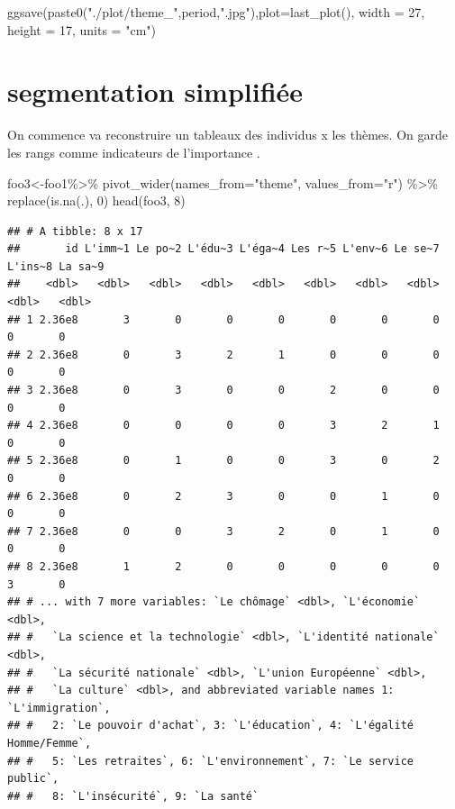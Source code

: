 \documentclass[
]{book}
\newenvironment{Shaded}{\begin{snugshade}}{\end{snugshade}}
\newcommand{\AttributeTok}[1]{\textcolor[rgb]{0.77,0.63,0.00}{#1}}
\newcommand{\DecValTok}[1]{\textcolor[rgb]{0.00,0.00,0.81}{#1}}
\newcommand{\FunctionTok}[1]{\textcolor[rgb]{0.00,0.00,0.00}{#1}}
\newcommand{\NormalTok}[1]{#1}
\newcommand{\OtherTok}[1]{\textcolor[rgb]{0.56,0.35,0.01}{#1}}
\newcommand{\SpecialCharTok}[1]{\textcolor[rgb]{0.00,0.00,0.00}{#1}}
\newcommand{\StringTok}[1]{\textcolor[rgb]{0.31,0.60,0.02}{#1}}
\begin{document}
\begin{Shaded}
\begin{Highlighting}[]
\FunctionTok{ggsave}\NormalTok{(}\FunctionTok{paste0}\NormalTok{(}\StringTok{"./plot/theme\_"}\NormalTok{,period,}\StringTok{".jpg"}\NormalTok{),}\AttributeTok{plot=}\FunctionTok{last\_plot}\NormalTok{(), }\AttributeTok{width =} \DecValTok{27}\NormalTok{, }\AttributeTok{height =} \DecValTok{17}\NormalTok{, }\AttributeTok{units =} \StringTok{"cm"}\NormalTok{)}
\end{Highlighting}
\end{Shaded}

\hypertarget{segmentation-simplifiuxe9e}{%
\section{segmentation simplifiée}\label{segmentation-simplifiuxe9e}}

On commence va reconstruire un tableaux des individus x les thèmes. On garde les rangs comme indicateurs de l'importance .

\begin{Shaded}
\begin{Highlighting}[]
\NormalTok{foo3}\OtherTok{\textless{}{-}}\NormalTok{foo1}\SpecialCharTok{\%\textgreater{}\%}  
  \FunctionTok{pivot\_wider}\NormalTok{(}\AttributeTok{names\_from=}\StringTok{"theme"}\NormalTok{, }\AttributeTok{values\_from=}\StringTok{"r"}\NormalTok{) }\SpecialCharTok{\%\textgreater{}\%}
  \FunctionTok{replace}\NormalTok{(}\FunctionTok{is.na}\NormalTok{(.), }\DecValTok{0}\NormalTok{)}
\FunctionTok{head}\NormalTok{(foo3, }\DecValTok{8}\NormalTok{)}
\end{Highlighting}
\end{Shaded}

\begin{verbatim}
## # A tibble: 8 x 17
##       id L'imm~1 Le po~2 L'édu~3 L'éga~4 Les r~5 L'env~6 Le se~7 L'ins~8 La sa~9
##    <dbl>   <dbl>   <dbl>   <dbl>   <dbl>   <dbl>   <dbl>   <dbl>   <dbl>   <dbl>
## 1 2.36e8       3       0       0       0       0       0       0       0       0
## 2 2.36e8       0       3       2       1       0       0       0       0       0
## 3 2.36e8       0       3       0       0       2       0       0       0       0
## 4 2.36e8       0       0       0       0       3       2       1       0       0
## 5 2.36e8       0       1       0       0       3       0       2       0       0
## 6 2.36e8       0       2       3       0       0       1       0       0       0
## 7 2.36e8       0       0       3       2       0       1       0       0       0
## 8 2.36e8       1       2       0       0       0       0       0       3       0
## # ... with 7 more variables: `Le chômage` <dbl>, `L'économie` <dbl>,
## #   `La science et la technologie` <dbl>, `L'identité nationale` <dbl>,
## #   `La sécurité nationale` <dbl>, `L'union Européenne` <dbl>,
## #   `La culture` <dbl>, and abbreviated variable names 1: `L'immigration`,
## #   2: `Le pouvoir d'achat`, 3: `L'éducation`, 4: `L'égalité Homme/Femme`,
## #   5: `Les retraites`, 6: `L'environnement`, 7: `Le service public`,
## #   8: `L'insécurité`, 9: `La santé`
\end{verbatim}
\end{document}

